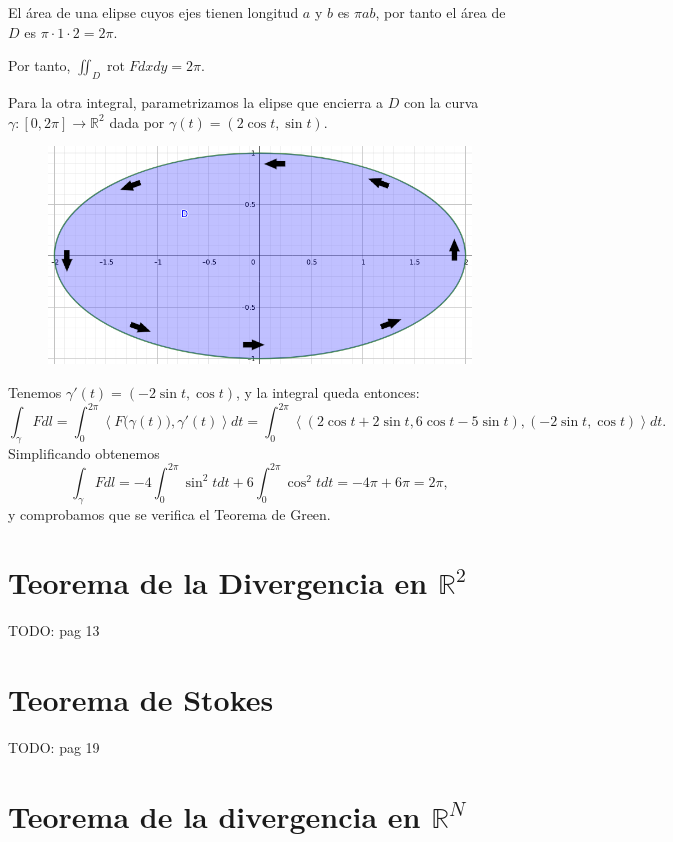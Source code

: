 \documentclass[12pt,spanish]{article}
\theoremstyle{definition}
\theoremstyle{remark}
\begin{document}
El área de una elipse cuyos ejes tienen longitud $a$ y $b$ es $\pi a b$, por tanto el área de $D$ es $\pi\cdot1\cdot 2=2\pi$.

Por tanto, $\displaystyle{\iint_D \operatorname{rot}F dx dy}=2\pi$.

Para la otra integral, parametrizamos la elipse que encierra a $D$ con la curva $\gamma:[0,2\pi]\rightarrow\mathbb{R}^2$ dada por $\gamma(t)=(2\cos t, \sin t)$.

\begin{figure}[H]
	\centering
	\includegraphics[width=120mm]{images/region-ejemplo-green-flechas}
\end{figure}

Tenemos $\gamma'(t)=(-2\sin t, \cos t)$, y la integral queda entonces:
\[\int_\gamma F dl = \int_0^{2\pi}\left\langle F\big(\gamma(t)\big),\gamma'(t)\right\rangle dt=\int_0^{2\pi}\left\langle (2\cos t+2\sin t,6\cos t-5\sin t),(-2\sin t, \cos t)\right\rangle dt.\]
Simplificando obtenemos
\[\int_\gamma F dl=-4\int_0^{2\pi}\sin^2 t dt +6\int_0^{2\pi}\cos^2 t dt=-4\pi+6\pi=2\pi,\]
y comprobamos que se verifica el Teorema de Green.

\section{Teorema de la Divergencia en $\mathbb{R}^2$}

TODO: pag 13

\section{Teorema de Stokes}

TODO: pag 19

\section{Teorema de la divergencia en $\mathbb{R}^N$}
\end{document}
